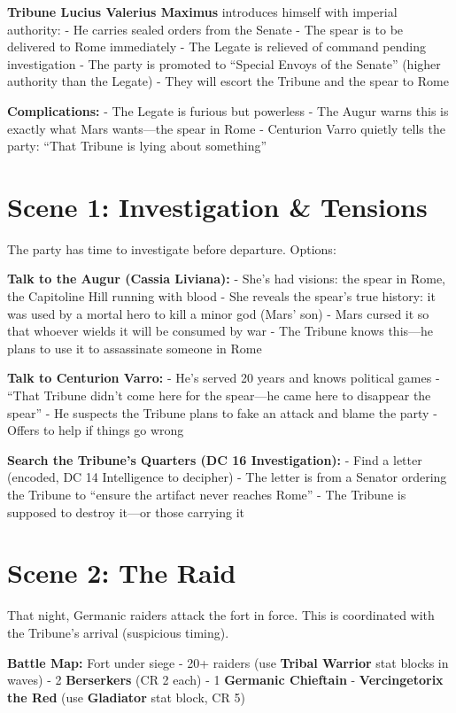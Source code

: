 \documentclass[
]{book}
\begin{document}
\textbf{Tribune Lucius Valerius Maximus} introduces himself with
imperial authority: - He carries sealed orders from the Senate - The
spear is to be delivered to Rome immediately - The Legate is relieved of
command pending investigation - The party is promoted to ``Special
Envoys of the Senate'' (higher authority than the Legate) - They will
escort the Tribune and the spear to Rome

\textbf{Complications:} - The Legate is furious but powerless - The
Augur warns this is exactly what Mars wants---the spear in Rome -
Centurion Varro quietly tells the party: ``That Tribune is lying about
something''

\section{Scene 1: Investigation \&
Tensions}\label{scene-1-investigation-tensions}

The party has time to investigate before departure. Options:

\textbf{Talk to the Augur (Cassia Liviana):} - She's had visions: the
spear in Rome, the Capitoline Hill running with blood - She reveals the
spear's true history: it was used by a mortal hero to kill a minor god
(Mars' son) - Mars cursed it so that whoever wields it will be consumed
by war - The Tribune knows this---he plans to use it to assassinate
someone in Rome

\textbf{Talk to Centurion Varro:} - He's served 20 years and knows
political games - ``That Tribune didn't come here for the spear---he
came here to disappear the spear'' - He suspects the Tribune plans to
fake an attack and blame the party - Offers to help if things go wrong

\textbf{Search the Tribune's Quarters (DC 16 Investigation):} - Find a
letter (encoded, DC 14 Intelligence to decipher) - The letter is from a
Senator ordering the Tribune to ``ensure the artifact never reaches
Rome'' - The Tribune is supposed to destroy it---or those carrying it

\section{Scene 2: The Raid}\label{scene-2-the-raid}

That night, Germanic raiders attack the fort in force. This is
coordinated with the Tribune's arrival (suspicious timing).

\textbf{Battle Map:} Fort under siege - 20+ raiders (use \textbf{Tribal
Warrior} stat blocks in waves) - 2 \textbf{Berserkers} (CR 2 each) - 1
\textbf{Germanic Chieftain} - \textbf{Vercingetorix the Red} (use
\textbf{Gladiator} stat block, CR 5)
\end{document}
